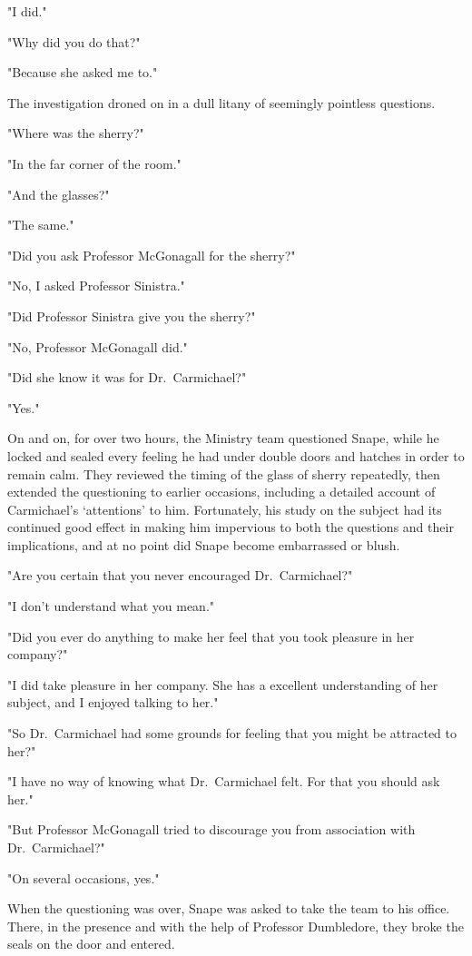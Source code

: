 "I did."

"Why did you do that?"

"Because she asked me to."

The investigation droned on in a dull litany of seemingly pointless questions.

"Where was the sherry?"

"In the far corner of the room."

"And the glasses?"

"The same."

"Did you ask Professor McGonagall for the sherry?"

"No, I asked Professor Sinistra."

"Did Professor Sinistra give you the sherry?"

"No, Professor McGonagall did."

"Did she know it was for Dr.~Carmichael?"

"Yes."

On and on, for over two hours, the Ministry team questioned Snape, while he locked and sealed every feeling he had under double doors and hatches in order to remain calm. They reviewed the timing of the glass of sherry repeatedly, then extended the questioning to earlier occasions, including a detailed account of Carmichael's `attentions' to him. Fortunately, his study on the subject had its continued good effect in making him impervious to both the questions and their implications, and at no point did Snape become embarrassed or blush.

"Are you certain that you never encouraged Dr.~Carmichael?"

"I don't understand what you mean."

"Did you ever do anything to make her feel that you took pleasure in her company?"

"I did take pleasure in her company. She has a excellent understanding of her subject, and I enjoyed talking to her."

"So Dr.~Carmichael had some grounds for feeling that you might be attracted to her?"

"I have no way of knowing what Dr.~Carmichael felt. For that you should ask her."

"But Professor McGonagall tried to discourage you from association with Dr.~Carmichael?"

"On several occasions, yes."

When the questioning was over, Snape was asked to take the team to his office. There, in the presence and with the help of Professor Dumbledore, they broke the seals on the door and entered.

